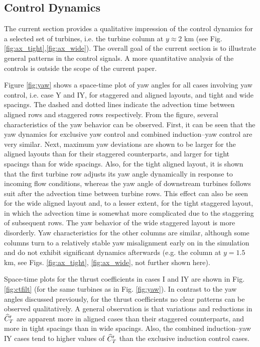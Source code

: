 \documentclass[a4paper]{jpconf}
\begin{document}
\subsection{Control Dynamics}
The current section provides a qualitative impression of the control dynamics for a selected set of turbines, i.e. the turbine column at $y \approx 2$ km (see Fig. \ref{fig:ax_tight},\ref{fig:ax_wide}). The overall goal of the current section is to illustrate general patterns in the control signals. A more quantitative analysis of the controls is outside the scope of the current paper. 

Figure \ref{fig:yaw} shows a space-time plot of yaw angles for all cases involving yaw control, i.e. case Y and IY, for staggered and aligned layouts, and tight and wide spacings. The dashed and dotted lines indicate the advection time between aligned rows and staggered rows respectively. From the figure, several characteristics of the yaw behavior can be observed. First, it can be seen that the yaw dynamics for exclusive yaw control and combined induction--yaw control are very similar. Next, maximum yaw deviations are shown to be larger for the aligned layouts than for their staggered counterparts, and larger for tight spacings than for wide spacings. Also, for the tight aligned layout, it is shown that the first turbine row adjusts its yaw angle dynamically in response to incoming flow conditions, whereas the yaw angle of downstream turbines follows suit after the advection time between turbine rows. This effect can also be seen for the wide aligned layout and, to a lesser extent, for the tight staggered layout, in which the advection time is somewhat more complicated due to the staggering of subsequent rows. The yaw behavior of the wide staggered layout is more disorderly. Yaw characteristics for the other columns are similar, although some columns turn to a relatively stable yaw misalignment early on in the simulation and do not exhibit significant dynamics afterwards (e.g. the column at $y = 1.5$ km, see Figs. \ref{fig:ax_tight}, \ref{fig:ax_wide}, not further shown here).

Space-time plots for the thrust coefficients in cases I and IY are shown in Fig. \ref{fig:ctfilt} (for the same turbines as in Fig. \ref{fig:yaw}). In contrast to the yaw angles discussed previously, for the thrust coefficients no clear patterns can be observed qualitatively. A general observation is that variations and reductions in $\widehat{C}_T'$ are apparent more in aligned cases than their staggered counterparts, and more in tight spacings than in wide spacings. Also, the combined induction--yaw IY cases tend to higher values of $\widehat{C}_T'$ than the exclusive induction control cases. 
\end{document}
